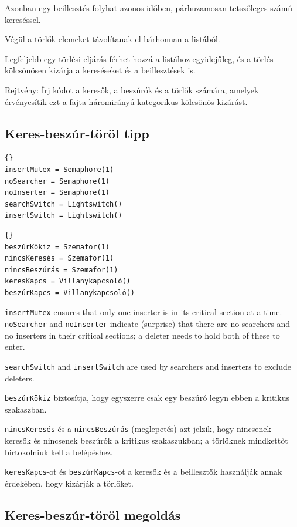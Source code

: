 \documentclass{book}
\newcommand{\clearemptydoublepage}{\newpage\cleardoublepage}
\begin{document}
Azonban egy beillesztés folyhat azonos időben, párhuzamosan tetszőleges számú kereséssel.
 
Végül a törlők elemeket távolítanak el bárhonnan a listából. 

Legfeljebb egy törlési eljárás férhet hozzá a listához egyidejűleg,
és a törlés kölcsönösen kizárja a kereséseket és a beillesztések is. 

Rejtvény: Írj kódot a keresők, a beszúrók és a törlők számára,
amelyek érvényesítik ezt a fajta háromirányú kategorikus kölcsönös kizárást.

\clearemptydoublepage
\subsection{Keres-beszúr-töröl tipp}

\begin{lstlisting}[title={Search-Insert-Delete hint}]{}
insertMutex = Semaphore(1)
noSearcher = Semaphore(1)
noInserter = Semaphore(1)
searchSwitch = Lightswitch()
insertSwitch = Lightswitch()
\end{lstlisting}

\begin{lstlisting}[title={Keres-beszúr-töröl tipp}]{}
beszúrKökiz = Szemafor(1)
nincsKeresés = Szemafor(1)
nincsBeszúrás = Szemafor(1)
keresKapcs = Villanykapcsoló()
beszúrKapcs = Villanykapcsoló()
\end{lstlisting}

{\tt insertMutex} ensures that only one inserter is in its critical
section at a time.  {\tt noSearcher} and {\tt noInserter} indicate
(surprise) that there are no searchers and no inserters in their
critical sections; a deleter needs to hold both of these to enter.

{\tt searchSwitch} and {\tt insertSwitch} are used by searchers and
inserters to exclude deleters.

{\tt beszúrKökiz} biztosítja, hogy egyszerre csak egy beszúró legyn ebben
a kritikus szakaszban. 

{\tt nincsKeresés} és a {\tt nincsBeszúrás} (meglepetés) azt jelzik, hogy nincsenek
keresők és nincsenek beszúrók a kritikus szakaszukban; a törlőknek
mindkettőt birtokolniuk kell a belépéshez.

{\tt keresKapcs}-ot és {\tt beszúrKapcs}-ot a keresők és a beillesztők használják
annak érdekében, hogy kizárják a törlőket.

\clearemptydoublepage
\subsection{Keres-beszúr-töröl megoldás}
\end{document}
